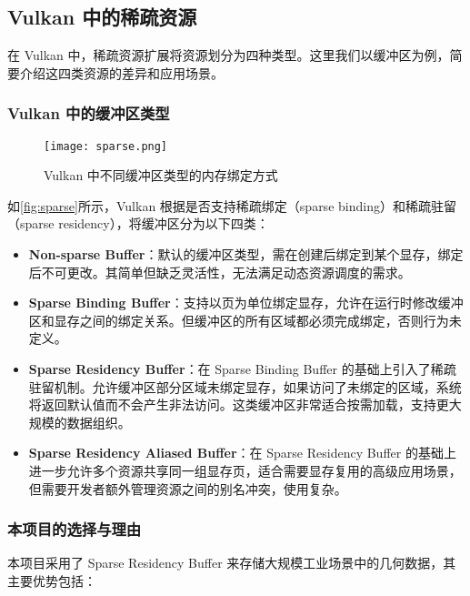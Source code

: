 \cleardoublepage

{

    \appendixsubsecmajornumbering

    \subsection{Vulkan 中的稀疏资源}
    \label{appendix:sparse}

    在 Vulkan 中，稀疏资源扩展将资源划分为四种类型。这里我们以缓冲区为例，简要介绍这四类资源的差异和应用场景。

    \subsubsection{Vulkan 中的缓冲区类型}

    \begin{figure}[htbp]
        \centering
        \texttt{[image: sparse.png]}
        \caption{\label{fig:sparse}Vulkan 中不同缓冲区类型的内存绑定方式}
    \end{figure}
    
    如\autoref{fig:sparse}所示，Vulkan 根据是否支持稀疏绑定（sparse binding）和稀疏驻留（sparse residency），将缓冲区分为以下四类：

    \begin{itemize}
        \item \textbf{Non-sparse Buffer}：默认的缓冲区类型，需在创建后绑定到某个显存，绑定后不可更改。其简单但缺乏灵活性，无法满足动态资源调度的需求。
        
        \item \textbf{Sparse Binding Buffer}：支持以页为单位绑定显存，允许在运行时修改缓冲区和显存之间的绑定关系。但缓冲区的所有区域都必须完成绑定，否则行为未定义。
        
        \item \textbf{Sparse Residency Buffer}：在 Sparse Binding Buffer 的基础上引入了稀疏驻留机制。允许缓冲区部分区域未绑定显存，如果访问了未绑定的区域，系统将返回默认值而不会产生非法访问。这类缓冲区非常适合按需加载，支持更大规模的数据组织。
        
        \item \textbf{Sparse Residency Aliased Buffer}：在 Sparse Residency Buffer 的基础上进一步允许多个资源共享同一组显存页，适合需要显存复用的高级应用场景，但需要开发者额外管理资源之间的别名冲突，使用复杂。
    \end{itemize}

    \subsubsection{本项目的选择与理由}
    本项目采用了 Sparse Residency Buffer 来存储大规模工业场景中的几何数据，其主要优势包括：

}
